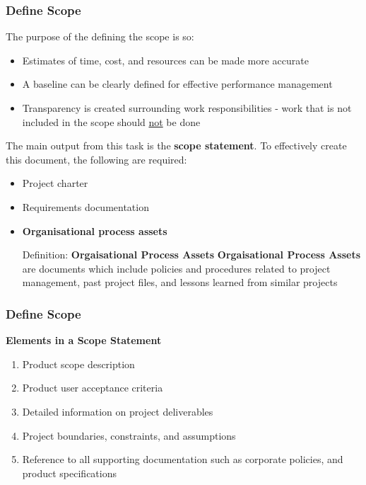 \documentclass[aspectratio=169]{beamer}
\begin{document}
\begin{frame}
\frametitle{Define Scope}
\small
The purpose of the defining the scope is so:
\begin{itemize}
\item Estimates of time, cost, and resources can be made more accurate
\item A baseline can be clearly defined for effective performance management
\item Transparency is created surrounding work responsibilities - work that is not included in the scope should \underline{not} be done
\end{itemize}

The main output from this task is the \textbf{scope statement}. To effectively create this document, the following are required:
\begin{itemize}
\item Project charter
\item Requirements documentation
\item \textbf{Organisational process assets}

\begin{block}{Definition: \textbf{Orgaisational Process Assets}}
\textbf{Orgaisational Process Assets} are documents which include policies and procedures related to project management, past project files, and lessons learned from similar projects
\end{block}
\end{itemize}
\end{frame}


\begin{frame}
\frametitle{Define Scope}
\begin{tcolorbox}
\textbf{Elements in a Scope Statement}
\begin{enumerate}
\item Product scope description
\item Product user acceptance criteria
\item Detailed information on project deliverables
\item Project boundaries, constraints, and assumptions
\item Reference to all supporting documentation such as corporate policies, and product specifications
\end{enumerate}
\end{tcolorbox}
\end{frame}
\end{document}
